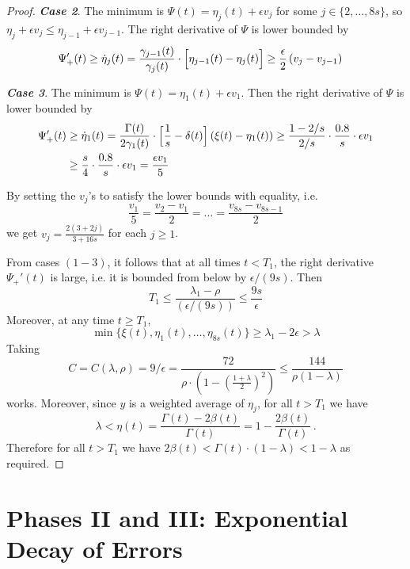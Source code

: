 \documentclass[a4paper,12pt]{article}
\begin{document}
\begin{proof}
	\noindent \textbf{\emph{Case 2}}. The minimum is $\Psi(t) = \eta_j(t) + \epsilon v_j$ for some $j \in \{2, \ldots, 8s\}$, so $\eta_j + \epsilon v_j \leq \eta_{j-1} + \epsilon v_{j-1}$.
	The right derivative of $\Psi$ is lower bounded by
	\begin{align}
	\Psi_{+}'(t) & \geq \dot{\eta}_j(t) = \frac{\gamma_{j-1}(t)}{\gamma_j(t)} \cdot \Bigl[ \eta_{j-1}(t) - \eta_j(t)\Bigr] \geq \frac{\epsilon}{2} \left( v_j - v_{j-1} \right)
	\end{align}	
	
	\noindent \textbf{\emph{Case 3}}. The minimum is $\Psi(t) = \eta_1(t) + \epsilon v_1$. Then the right derivative of $\Psi$ is lower bounded by
	\begin{align}
	\Psi_{+}'(t) & \geq \dot{\eta}_1(t) = \frac{\Gamma(t)}{2 \gamma_1(t)} \cdot \Bigl[ \frac{1}{s} - \delta(t) \Bigr] \left( \xi(t) - \eta_1(t) \right) \geq \frac{1 - 2/s}{2/s} \cdot \frac{0.8}{s} \cdot \epsilon v_1 \notag \\
	& \geq \frac{s}{4} \cdot \frac{0.8}{s} \cdot \epsilon v_1  = \frac{\epsilon v_1}{5}
	\end{align}
	
	By setting the $v_j$'s to satisfy the lower bounds with equality, i.e. $$
	\frac{v_1}{5} = \frac{v_2 - v_1}{2} = \ldots = \frac{v_{8s} - v_{8s-1}}{2}
	$$
we get $v_j  = \frac{2(3+ 2j)}{3+16s}$ for each $j \geq 1$.
\medskip
	
\noindent From cases $(1-3)$, it follows that at all times $t < T_{1}$, the right derivative $\Psi_{+}'(t) $ is large, i.e. it is bounded from below by $\epsilon/(9s)$. Then
	$$
	T_{1} \leq \frac{\lambda_1 - \rho}{(\epsilon/(9s))} \leq \frac{9s}{\epsilon}
	$$
	Moreover, at any time $t \geq T_{1}$,
	$$
	\min\{\xi(t), \eta_1(t), \ldots, \eta_{8s}(t)\} \geq \lambda_1 - 2 \epsilon > \lambda
	$$
	Taking
	$$
	C = C(\lambda, \rho) = 9/\epsilon = \frac{72}{\rho \cdot \left(1 - \left(\frac{1 + \lambda}{2}\right)^2\right)} \leq \frac{144}{\rho (1 - \lambda)}
	$$
	works. Moreover, since $y$ is a weighted average of $\eta_j$, for all $t > T_1$ we have
	$$\lambda < \eta(t) = \frac{\Gamma(t) - 2 \beta(t)}{\Gamma(t)} = 1 - \frac{2\beta(t)}{\Gamma(t)}\, .$$
	Therefore for all $t > T_1$ we have
	$
	2 \beta(t) < \Gamma(t)  \cdot (1 - \lambda) < 1 - \lambda
	$
as required.
\end{proof}

\section{Phases II and III: Exponential Decay of Errors} \label{sec:phases_2and3}
\end{document}
